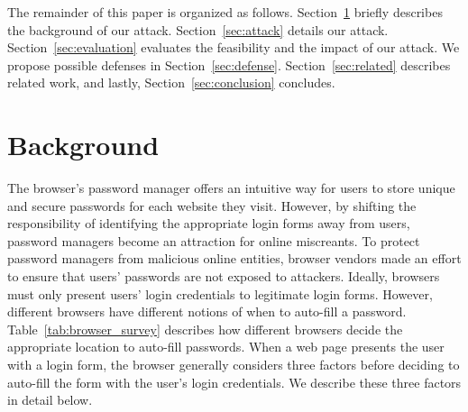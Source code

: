 \documentclass[letterpaper,twocolumn,10pt]{article}
\begin{document}
The remainder of this paper is organized as follows. 
Section~\ref{sec:background} briefly describes the background of our 
attack. Section~\ref{sec:attack} details our attack. 
Section~\ref{sec:evaluation} evaluates the feasibility and the impact 
of our attack. We propose possible defenses in 
Section~\ref{sec:defense}. Section~\ref{sec:related} describes related work,
and lastly, Section~\ref{sec:conclusion} concludes.


\section{Background}
\label{sec:background}
The browser's password manager offers an intuitive way for users to 
store unique and secure passwords for each website they visit. 
However, by shifting the responsibility of identifying the appropriate 
login forms away from users, password managers become an attraction 
for online miscreants. To protect password managers from malicious 
online entities, browser vendors made an effort to ensure that users' 
passwords are not exposed to attackers. Ideally, browsers must only 
present users' login credentials to legitimate login forms. However, 
different browsers have different notions of when to auto-fill a 
password. Table~\ref{tab:browser_survey} describes how different 
browsers decide the appropriate location to auto-fill passwords. When 
a web page presents the user with a login form, the browser generally 
considers three factors before deciding to auto-fill the form with the 
user's login credentials. We describe these three factors in detail 
below.
\end{document}
